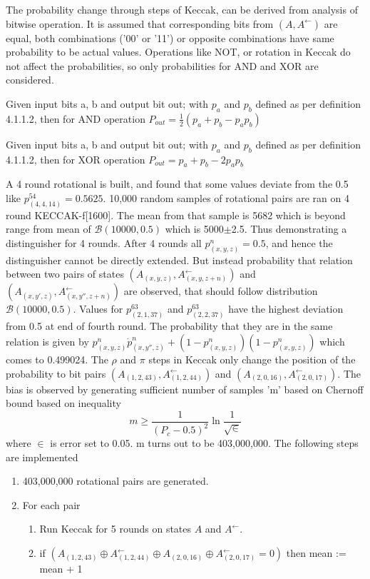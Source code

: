 The probability change through steps of Keccak, can be derived from analysis of bitwise operation. It is assumed
that corresponding bits from $(A, A^{\leftarrow})$ are equal, both combinations ('00' or '11') or opposite combinations
have same probability to be actual values. Operations like NOT, or rotation in Keccak do not affect the probabilities,
so only probabilities for AND and XOR are considered.

\begin{lem}
Given input bits a, b and output bit out; with $p_a$ and $p_b$ defined as per definition 4.1.1.2, then for AND operation
$P_{out} = \frac{1}{2}(p_{a} + p_{b} - p_{a} p_{b})$ \cite{00022}
\end{lem}

\begin{lem}
Given input bits a, b and output bit out; with $p_a$ and $p_b$ defined as per definition 4.1.1.2, then for XOR operation
$P_{out} = p_{a} + p_{b} - 2 p_{a} p_{b}$ \cite{00022}
\end{lem}

A 4 round rotational is built, and found that some values deviate from the 0.5 like $p^{54}_{(4, 4, 14)} = 0.5625$. 10,000
random samples of rotational pairs are ran on 4 round KECCAK-f[1600]. The mean from that sample is 5682 which is beyond
range from mean of $\mathcal{B}(10000, 0.5)$ which is 5000$\pm$2.5. Thus demonstrating a distinguisher for 4 rounds.
After 4 rounds all $p^n_{(x, y, z)} = 0.5$, and hence the distinguisher cannot be directly extended. But instead probability
that relation between two pairs of states $(A_{(x, y, z)}, A^{\leftarrow}_{(x, y, z+n)})$ and 
$(A_{(x, y', z)}, A^{\leftarrow}_{(x, y'', z+n)})$ are observed, that should follow distribution $\mathcal{B}(10000, 0.5)$.
Values for $p^63_{(2, 1, 37)}$ and $p^63_{(2, 2, 37)}$ have the highest deviation from 0.5 at end of fourth round. The
probability that they are in the same relation is given by $p^n_{(x, y, z)} \dot p^n_{(x, y'', z)} + (1 - p^n_{(x, y, z)})
(1 - p^n_{(x, y, z)})$ which comes to 0.499024. The $\rho$ and $\pi$ steps in Keccak only change the position of the
probability to bit pairs $(A_{(1, 2, 43)}, A^{\leftarrow}_{(1, 2, 44)})$ and $(A_{(2, 0, 16)}, A^{\leftarrow}_{(2, 0, 17)})$.
The bias is observed by generating sufficient number of samples 'm' based on Chernoff bound based on inequality 
\[ m \geq \frac{1}{(P_c - 0.5)^2} \ln \frac{1}{\sqrt \in}\]
where $\in$ is error set to 0.05. m turns out to be 403,000,000. The following steps are implemented \cite{00022}
\begin{enumerate}
\item 403,000,000 rotational pairs are generated.
\item For each pair
  \begin{enumerate}
  \item Run Keccak for 5 rounds on states $A$ and $A^{\leftarrow}$.
  \item if $(A_{(1, 2, 43)} \oplus A^{\leftarrow}_{(1, 2, 44)} \oplus A_{(2, 0, 16)} \oplus A^{\leftarrow}_{(2, 0, 17)} = 0)$
  then \newline mean := mean + 1
  \end{enumerate}
\end{enumerate}


